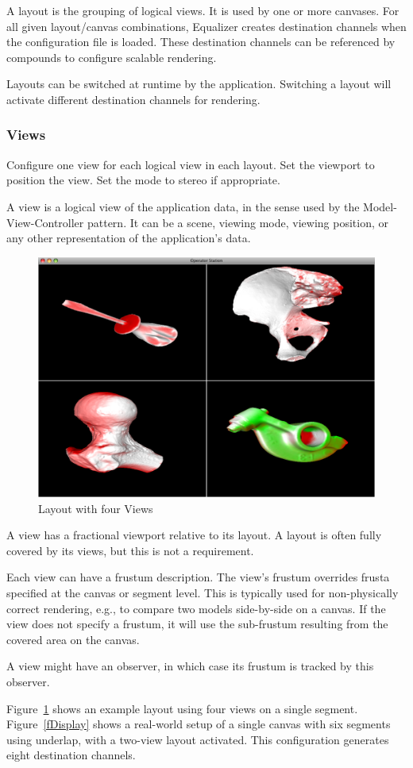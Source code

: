 \documentclass[10pt,a4]{scrartcl}
\newcommand{\fig}[1]{Figure~\ref{#1}}
\begin{document}
A layout is the grouping of logical views. It is used by one or more
canvases. For all given layout/canvas combinations, Equalizer creates
destination channels when the configuration file is loaded. These
destination channels can be referenced by compounds to configure
scalable rendering.

Layouts can be switched at runtime by the application. Switching a
layout will activate different destination channels for rendering.

\subsubsection{Views}

Configure one \textsf{view} for each logical view in each layout. Set the
\textsf{viewport} to position the view. Set the mode to stereo if appropriate.

A view is a logical view of the application data, in the sense used by
the Model-View-Controller pattern. It can be a scene, viewing mode,
viewing position, or any other representation of the application's data.

\begin{figure}
  \includegraphics[width=.382\textwidth]{images/layout.png}
  {\caption{\label{fLayout}Layout with four Views}}
\end{figure}
A view has a fractional viewport relative to its layout.  A layout
is often fully covered by its views, but this is not a requirement.

Each view can have a frustum description. The view's frustum overrides
frusta specified at the canvas or segment level. This is typically used
for non-physically correct rendering, e.g., to compare two models
side-by-side on a canvas. If the view does not specify a frustum, it
will use the sub-frustum resulting from the covered area on the canvas.

A view might have an observer, in which case its frustum is tracked by
this observer. 

\fig{fLayout} shows an example layout using four views on a single
segment. \fig{fDisplay} shows a real-world setup of a single canvas with six
segments using underlap, with a two-view layout activated. This configuration
generates eight destination channels.
\end{document}
